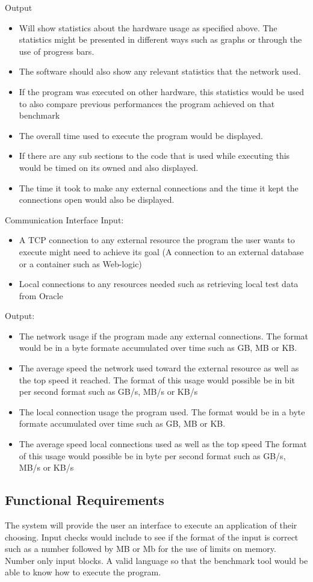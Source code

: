 \documentclass[a4paper,12pt]{article}
\begin{document}
Output
\begin{itemize}
\item Will show statistics about the hardware usage as specified above. The statistics might be presented in different ways such as graphs or through the use of progress bars. 
\item The software should also show any relevant statistics that the network used. 
\item If the program was executed on other hardware, this statistics would be used to also compare previous performances the program achieved on that benchmark
\item The overall time used to execute the program would be displayed.
\item If there are any sub sections to the code that is used while executing this would be timed on its owned and also displayed.
\item The time it took to make any external connections and the time it kept the connections open would also be displayed.  
\end{itemize}
Communication Interface
Input:
\begin{itemize}
\item A TCP connection to any external resource the program the user wants to execute might need to achieve its goal (A connection to an external database or a container such as Web-logic) 
\item Local connections to any resources needed such as retrieving local test data from Oracle
\end{itemize}
Output:
\begin{itemize}
\item The network usage if the program made any external connections. The format would be in a byte formate accumulated over time such as GB, MB or KB.
\item The average speed the network used toward the external resource as well as the top speed it reached. The format of this usage would possible be in bit per second format such as GB/s, MB/s or KB/s 
\item The local connection usage the program used. The format would be in a byte formate accumulated over time such as GB, MB or KB.
\item The average speed local connections used as well as the top speed The format of this usage would possible be in byte per second format such as GB/s, MB/s or KB/s 
\end{itemize}


\subsection{Functional Requirements}
 The system will provide the user an interface to execute an application of their choosing. Input checks would include to see if the format of the input is correct such as a number followed by MB or Mb for the use of limits on memory. Number only input blocks. A valid language so that the benchmark tool would be able to know how to execute the program. 
 
\end{document}
